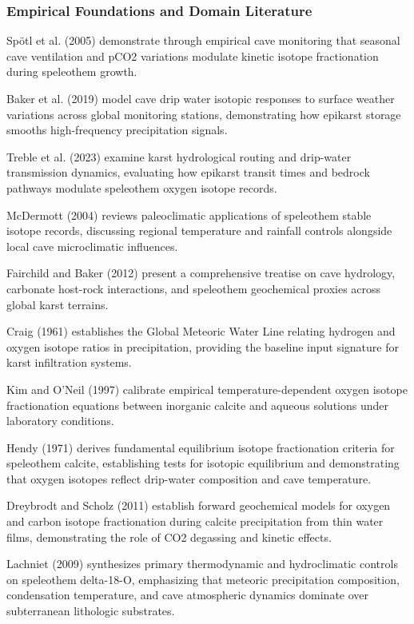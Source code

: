 \documentclass[sn-basic,Numbered]{sn-jnl}%
\begin{document}
\subsubsection{Empirical Foundations and Domain Literature}

Spötl et al. (2005) demonstrate through empirical cave monitoring that seasonal cave ventilation and pCO2 variations modulate kinetic isotope fractionation during speleothem growth. \cite{sp2005_1}

Baker et al. (2019) model cave drip water isotopic responses to surface weather variations across global monitoring stations, demonstrating how epikarst storage smooths high-frequency precipitation signals. \cite{baker2019_2}

Treble et al. (2023) examine karst hydrological routing and drip-water transmission dynamics, evaluating how epikarst transit times and bedrock pathways modulate speleothem oxygen isotope records. \cite{treble2023_3}

McDermott (2004) reviews paleoclimatic applications of speleothem stable isotope records, discussing regional temperature and rainfall controls alongside local cave microclimatic influences. \cite{mcdermott2004_4}

Fairchild and Baker (2012) present a comprehensive treatise on cave hydrology, carbonate host-rock interactions, and speleothem geochemical proxies across global karst terrains. \cite{fairchild2012_5}

Craig (1961) establishes the Global Meteoric Water Line relating hydrogen and oxygen isotope ratios in precipitation, providing the baseline input signature for karst infiltration systems. \cite{craig1961_6}

Kim and O'Neil (1997) calibrate empirical temperature-dependent oxygen isotope fractionation equations between inorganic calcite and aqueous solutions under laboratory conditions. \cite{kim1997_7}

Hendy (1971) derives fundamental equilibrium isotope fractionation criteria for speleothem calcite, establishing tests for isotopic equilibrium and demonstrating that oxygen isotopes reflect drip-water composition and cave temperature. \cite{hendy1971_8}

Dreybrodt and Scholz (2011) establish forward geochemical models for oxygen and carbon isotope fractionation during calcite precipitation from thin water films, demonstrating the role of CO2 degassing and kinetic effects. \cite{dreybrodt2011_9}

Lachniet (2009) synthesizes primary thermodynamic and hydroclimatic controls on speleothem delta-18-O, emphasizing that meteoric precipitation composition, condensation temperature, and cave atmospheric dynamics dominate over subterranean lithologic substrates. \cite{lachniet2009_10}
\end{document}
